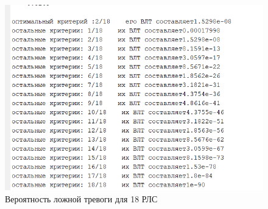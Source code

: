 \begin{figure}
    \centering
    \includegraphics[scale = 0.7]{figures/VLT_18.png}
    \caption{Вероятность ложной тревоги для 18 РЛС}
    \label{fig:my_label}
\end{figure}
